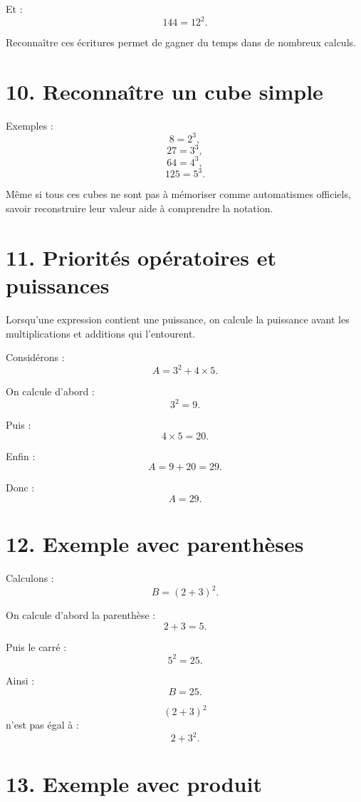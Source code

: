 Et :
\[
144=12^2.
\]

Reconnaître ces écritures permet de gagner du temps dans de nombreux calculs.

\section{10. Reconnaître un cube simple}

Exemples :
\[
8=2^3,
\]
\[
27=3^3,
\]
\[
64=4^3,
\]
\[
125=5^3.
\]

Même si tous ces cubes ne sont pas à mémoriser comme automatismes officiels, savoir reconstruire leur valeur aide à comprendre la notation.

\section{11. Priorités opératoires et puissances}

Lorsqu'une expression contient une puissance, on calcule la puissance avant les multiplications et additions qui l'entourent.


Considérons :
\[
A=3^2+4\times5.
\]

On calcule d'abord :
\[
3^2=9.
\]

Puis :
\[
4\times5=20.
\]

Enfin :
\[
A=9+20=29.
\]

Donc :
\[
\boxed{A=29}.
\]

\section{12. Exemple avec parenthèses}

Calculons :
\[
B=(2+3)^2.
\]

On calcule d'abord la parenthèse :
\[
2+3=5.
\]

Puis le carré :
\[
5^2=25.
\]

Ainsi :
\[
\boxed{B=25}.
\]

\begin{attention}
\[
(2+3)^2
\]
n'est pas égal à :
\[
2+3^2.
\]
\end{attention}

\section{13. Exemple avec produit}

